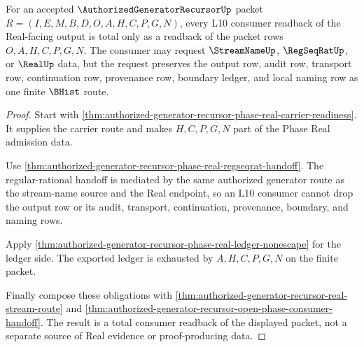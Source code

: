 \begin{theorem}
\label{thm:authorized-generator-recursor-l10-consumer-readback-totality}
For an accepted $\AuthorizedGeneratorRecursorUp$ packet $R=(I,E,M,B,D,O,A,H,C,P,G,N)$, every L10 consumer readback of the Real-facing output is total only as a readback of the packet rows $O,A,H,C,P,G,N$. The consumer may request $\StreamNameUp$, $\RegSeqRatUp$, or $\RealUp$ data, but the request preserves the output row, audit row, transport row, continuation row, provenance row, boundary ledger, and local naming row as one finite $\BHist$ route.
\end{theorem}
\begin{proof}
Start with \autoref{thm:authorized-generator-recursor-phase-real-carrier-readiness}. It supplies the carrier route and makes $H,C,P,G,N$ part of the Phase Real admission data.

Use \autoref{thm:authorized-generator-recursor-phase-real-regseqrat-handoff}. The regular-rational handoff is mediated by the same authorized generator route as the stream-name source and the Real endpoint, so an L10 consumer cannot drop the output row or its audit, transport, continuation, provenance, boundary, and naming rows.

Apply \autoref{thm:authorized-generator-recursor-phase-real-ledger-nonescape} for the ledger side. The exported ledger is exhausted by $A,H,C,P,G,N$ on the finite packet.

Finally compose these obligations with \autoref{thm:authorized-generator-recursor-real-stream-route} and \autoref{thm:authorized-generator-recursor-open-phase-consumer-handoff}. The result is a total consumer readback of the displayed packet, not a separate source of Real evidence or proof-producing data.
\end{proof}

